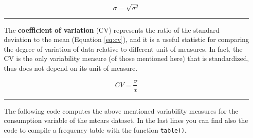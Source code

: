 \documentclass[
]{article}
\newenvironment{Shaded}{\begin{snugshade}}{\end{snugshade}}
\newcommand{\AttributeTok}[1]{\textcolor[rgb]{0.13,0.29,0.53}{#1}}
\newcommand{\CommentTok}[1]{\textcolor[rgb]{0.56,0.35,0.01}{\textit{#1}}}
\newcommand{\DecValTok}[1]{\textcolor[rgb]{0.00,0.00,0.81}{#1}}
\newcommand{\FunctionTok}[1]{\textcolor[rgb]{0.13,0.29,0.53}{\textbf{#1}}}
\newcommand{\NormalTok}[1]{#1}
\newcommand{\SpecialCharTok}[1]{\textcolor[rgb]{0.81,0.36,0.00}{\textbf{#1}}}
\begin{document}
\begin{equation}
\sigma=\sqrt{\sigma^2}
\label{eq:sd}
\end{equation}

\begin{center}\rule{0.5\linewidth}{0.5pt}\end{center}

The \textbf{coefficient of variation} (CV) represents the ratio of the
standard deviation to the mean (Equation \eqref{eq:cv}), and it is a useful
statistic for comparing the degree of variation of data relative to
different unit of measures. In fact, the CV is the only variability
measure (of those mentioned here) that is standardized, thus does not
depend on its unit of measure.

\begin{equation}
CV=\frac{\sigma}{\bar{x}}
\label{eq:cv}
\end{equation}

\begin{center}\rule{0.5\linewidth}{0.5pt}\end{center}

The following code computes the above mentioned variability measures for
the consumption variable of the mtcars dataset. In the last lines you
can find also the code to compile a frequency table with the function
\texttt{table()}.

\begin{Shaded}
\end{Shaded}
\end{document}
